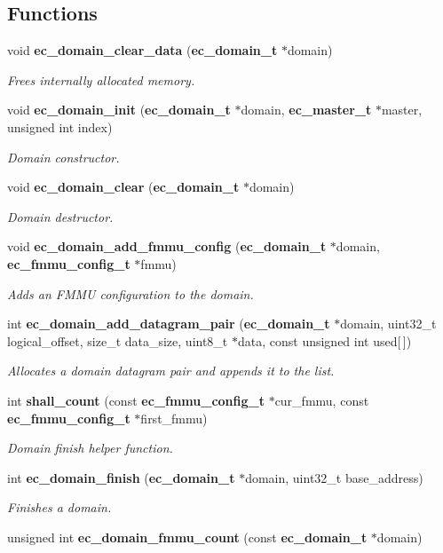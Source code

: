 \subsection*{Functions}
\begin{DoxyCompactItemize}
\item 
void {\bf ec\-\_\-domain\-\_\-clear\-\_\-data} ({\bf ec\-\_\-domain\-\_\-t} $\ast$domain)
\begin{DoxyCompactList}\small\item\em Frees internally allocated memory. \end{DoxyCompactList}\item 
void {\bf ec\-\_\-domain\-\_\-init} ({\bf ec\-\_\-domain\-\_\-t} $\ast$domain, {\bf ec\-\_\-master\-\_\-t} $\ast$master, unsigned int index)
\begin{DoxyCompactList}\small\item\em Domain constructor. \end{DoxyCompactList}\item 
void {\bf ec\-\_\-domain\-\_\-clear} ({\bf ec\-\_\-domain\-\_\-t} $\ast$domain)
\begin{DoxyCompactList}\small\item\em Domain destructor. \end{DoxyCompactList}\item 
void {\bf ec\-\_\-domain\-\_\-add\-\_\-fmmu\-\_\-config} ({\bf ec\-\_\-domain\-\_\-t} $\ast$domain, {\bf ec\-\_\-fmmu\-\_\-config\-\_\-t} $\ast$fmmu)
\begin{DoxyCompactList}\small\item\em Adds an F\-M\-M\-U configuration to the domain. \end{DoxyCompactList}\item 
int {\bf ec\-\_\-domain\-\_\-add\-\_\-datagram\-\_\-pair} ({\bf ec\-\_\-domain\-\_\-t} $\ast$domain, uint32\-\_\-t logical\-\_\-offset, size\-\_\-t data\-\_\-size, uint8\-\_\-t $\ast$data, const unsigned int used[$\,$])
\begin{DoxyCompactList}\small\item\em Allocates a domain datagram pair and appends it to the list. \end{DoxyCompactList}\item 
int {\bf shall\-\_\-count} (const {\bf ec\-\_\-fmmu\-\_\-config\-\_\-t} $\ast$cur\-\_\-fmmu, const {\bf ec\-\_\-fmmu\-\_\-config\-\_\-t} $\ast$first\-\_\-fmmu)
\begin{DoxyCompactList}\small\item\em Domain finish helper function. \end{DoxyCompactList}\item 
int {\bf ec\-\_\-domain\-\_\-finish} ({\bf ec\-\_\-domain\-\_\-t} $\ast$domain, uint32\-\_\-t base\-\_\-address)
\begin{DoxyCompactList}\small\item\em Finishes a domain. \end{DoxyCompactList}\item 
unsigned int {\bf ec\-\_\-domain\-\_\-fmmu\-\_\-count} (const {\bf ec\-\_\-domain\-\_\-t} $\ast$domain)\label{domain_8c_a7af777c7a15fc667d283794dcf2cc498}


\end{DoxyCompactItemize}
